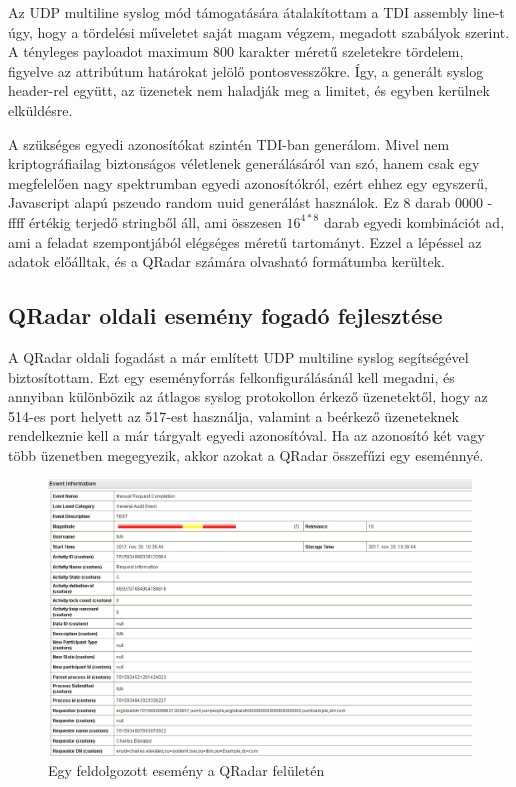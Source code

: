 Az UDP multiline syslog mód támogatására átalakítottam a TDI assembly line-t úgy, hogy a tördelési műveletet saját magam végzem, megadott szabályok szerint. A tényleges payloadot maximum 800 karakter méretű szeletekre tördelem, figyelve az attribútum határokat jelölő pontosvesszőkre. Így, a generált syslog header-rel együtt, az üzenetek nem haladják meg a limitet, és egyben kerülnek elküldésre. 

A szükséges egyedi azonosítókat szintén TDI-ban generálom. Mivel nem kriptográfiailag biztonságos véletlenek generálásáról van szó, hanem csak egy megfelelően nagy spektrumban egyedi azonosítókról, ezért ehhez egy egyszerű, Javascript alapú pszeudo random uuid generálást használok. Ez 8 darab 0000 - ffff értékig terjedő stringből áll, ami összesen $16^{4 * 8} $ darab egyedi kombinációt ad, ami a feladat szempontjából elégséges méretű tartományt. Ezzel a lépéssel az adatok előálltak, és a QRadar számára olvasható formátumba kerültek.


\subsection{QRadar oldali esemény fogadó fejlesztése}

A QRadar oldali fogadást a már említett UDP multiline syslog segítségével biztosítottam. Ezt egy eseményforrás felkonfigurálásánál kell megadni, és annyiban különbözik az átlagos syslog protokollon érkező üzenetektől, hogy az 514-es port helyett az 517-est használja, valamint a beérkező üzeneteknek rendelkeznie kell a már tárgyalt egyedi azonosítóval. Ha az azonosító két vagy több üzenetben megegyezik, akkor azokat a QRadar összefűzi egy eseménnyé.
\begin{figure}
	\centering
	\includegraphics[width=1.0\linewidth]{figures/qradarproperties}
	\caption{Egy feldolgozott esemény a QRadar felületén}
	\label{fig:qradarproperties}
\end{figure}

